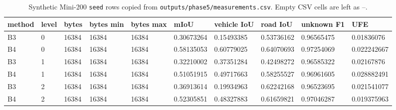 \begin{table}[t]
\centering
\caption{Synthetic Mini-200 \texttt{seed} rows copied from \texttt{outputs/phase5/measurements.csv}. Empty CSV cells are left as --.}
\label{tab:seed}
\scriptsize
\setlength{\tabcolsep}{3pt}
\begin{tabular}{llllllllll}
\toprule
method & level & bytes & bytes min & bytes max & mIoU & vehicle IoU & road IoU & unknown F1 & UFE \\
\midrule
B3 & 0 & 16384 & 16384 & 16384 & 0.30673264 & 0.15493385 & 0.53736162 & 0.96565475 & 0.01836076 \\
B4 & 0 & 16384 & 16384 & 16384 & 0.58135053 & 0.60779025 & 0.64070693 & 0.97254069 & 0.022242667 \\
B3 & 1 & 16384 & 16384 & 16384 & 0.32210002 & 0.37351284 & 0.42498272 & 0.96585322 & 0.02167876 \\
B4 & 1 & 16384 & 16384 & 16384 & 0.51051915 & 0.49717663 & 0.58255527 & 0.96961605 & 0.028882491 \\
B3 & 2 & 16384 & 16384 & 16384 & 0.36913614 & 0.19934963 & 0.62242168 & 0.96523695 & 0.021541077 \\
B4 & 2 & 16384 & 16384 & 16384 & 0.52305851 & 0.48327883 & 0.61659821 & 0.97046287 & 0.019375963 \\
\bottomrule
\end{tabular}
\end{table}
